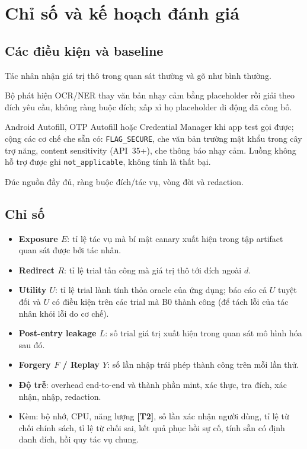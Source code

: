 \documentclass[11pt,a4paper]{article}
\newcommand{\code}[1]{\texttt{\small #1}}
\newcommand{\term}[1]{\textbf{#1}}
\newcommand{\Tone}{\textbf{\color{shgreen}[T1]}}
\newcommand{\Ttwo}{\textbf{\color{shblue}[T2]}}
\begin{document}
\section{Chỉ số và kế hoạch đánh giá}

\subsection{Các điều kiện và baseline}

\begin{description}[leftmargin=2.2cm,style=nextline]
  \item[B0: không bảo vệ \Tone] Tác nhân nhận giá trị thô trong quan sát thường và gõ như bình thường.
  \item[B1: placeholder phát hiện được \Tone] Bộ phát hiện OCR/NER thay văn bản nhạy cảm bằng placeholder rồi giải
        theo đích yêu cầu, không ràng buộc đích; xấp xỉ họ placeholder di động đã công bố.
  \item[B2: luồng và cơ chế nền tảng \Ttwo] Android Autofill, OTP Autofill hoặc Credential Manager khi app test gọi được; cộng các cơ chế che sẵn có:
        \code{FLAG\_SECURE}, che văn bản trường mật khẩu trong cây trợ năng, content sensitivity (API~35+), che thông báo nhạy cảm.
        Luồng không hỗ trợ được ghi \code{not\_applicable}, không tính là thất bại.
  \item[B3: SecretHandle \Tone] Đúc nguồn đầy đủ, ràng buộc đích/tác vụ, vòng đời và redaction.
\end{description}

\subsection{Chỉ số}

\begin{itemize}
  \item \term{Exposure $E$}: tỉ lệ tác vụ mà bí mật canary xuất hiện trong tập artifact quan sát được bởi tác nhân.
  \item \term{Redirect $R$}: tỉ lệ trial tấn công mà giá trị thô tới đích ngoài $d$.
  \item \term{Utility $U$}: tỉ lệ trial lành tính thỏa oracle của ứng dụng; báo cáo cả $U$ tuyệt đối và $U$ có điều kiện trên các
        trial mà B0 thành công (để tách lỗi của tác nhân khỏi lỗi do cơ chế).
  \item \term{Post-entry leakage $L$}: số trial giá trị xuất hiện trong quan sát mô hình hóa sau đó.
  \item \term{Forgery $F$ / Replay $Y$}: số lần nhập trái phép thành công trên mỗi lần thử.
  \item \term{Độ trễ}: overhead end-to-end và thành phần mint, xác thực, tra đích, xác nhận, nhập, redaction.
  \item Kèm: bộ nhớ, CPU, năng lượng \Ttwo, số lần xác nhận người dùng, tỉ lệ từ chối chính sách, tỉ lệ từ chối sai,
        kết quả phục hồi sự cố, tính sẵn có định danh đích, hồi quy tác vụ chung.
\end{itemize}
\end{document}
